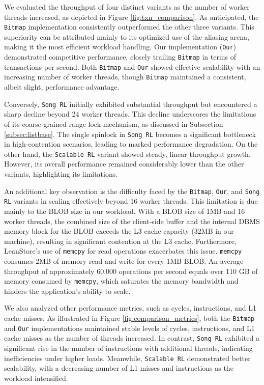 We evaluated the throughput of four distinct variants as the number of worker threads increased, as depicted in Figure \ref{fig:txn_comparison}. 
As anticipated, the \texttt{Bitmap} implementation consistently outperformed the other three variants. 
This superiority can be attributed mainly to its optimized use of the aliasing arena, making it the most efficient workload handling. 
Our implementation (\texttt{Our}) demonstrated competitive performance, closely trailing \texttt{Bitmap} in terms of transactions per second. 
Both \texttt{Bitmap} and \texttt{Our} showed effective scalability with an increasing number of worker threads, though \texttt{Bitmap} maintained a consistent, albeit slight, performance advantage.

Conversely, \texttt{Song RL} initially exhibited substantial throughput but encountered a sharp decline beyond 24 worker threads. 
This decline underscores the limitations of its coarse-grained range lock mechanism, as discussed in Subsection \ref{subsec:listbase}. 
The single spinlock in \texttt{Song RL} becomes a significant bottleneck in high-contention scenarios, leading to marked performance degradation. 
On the other hand, the \texttt{Scalable RL} variant showed steady, linear throughput growth. 
However, its overall performance remained considerably lower than the other variants, highlighting its limitations.

An additional key observation is the difficulty faced by the \texttt{Bitmap}, \texttt{Our}, and \texttt{Song RL} variants in scaling effectively beyond 16 worker threads. 
This limitation is due mainly to the BLOB size in our workload. With a BLOB size of 1MB and 16 worker threads, the combined size of the client-side buffer and the internal DBMS memory block for the BLOB exceeds the L3 cache capacity (32MB in our machine), resulting in significant contention at the L3 cache. 
Furthermore, LeanStore's use of \texttt{memcpy} for read operations exacerbates this issue. \texttt{memcpy} consumes 2MB of memory read and write for every 1MB BLOB. 
An average throughput of approximately 60,000 operations per second equals over 110 GB of memory consumed by \texttt{memcpy}, which saturates the memory bandwidth and hinders the application's ability to scale.

We also analyzed other performance metrics, such as cycles, instructions, and L1 cache misses. 
As illustrated in Figure \ref{fig:comparison_metrics}, both the \texttt{Bitmap} and \texttt{Our} implementations maintained stable levels of cycles, instructions, and L1 cache misses as the number of threads increased. 
In contrast, \texttt{Song RL} exhibited a significant rise in the number of instructions with additional threads, indicating inefficiencies under higher loads. 
Meanwhile, \texttt{Scalable RL} demonstrated better scalability, with a decreasing number of L1 misses and instructions as the workload intensified.


